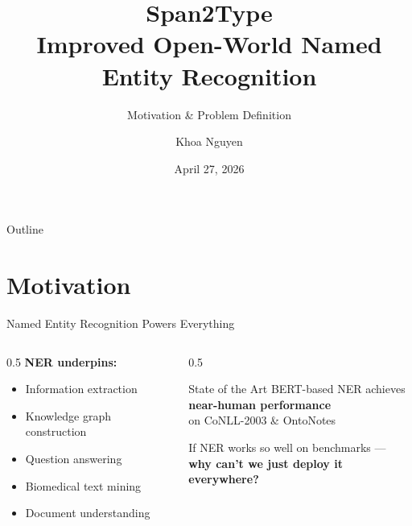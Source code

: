 \documentclass[aspectratio=169]{beamer}
\title[Span2Type]{\textbf{Span2Type}\\
  \large Improved Open-World Named Entity Recognition}
\subtitle{Motivation \& Problem Definition}
\author{Khoa Nguyen}
\date{April 27, 2026}
\newcommand{\highlight}[1]{\textcolor{accent}{\textbf{#1}}}
\begin{document}
\begin{frame}
  \titlepage
\end{frame}

\begin{frame}{Outline}
  \tableofcontents
\end{frame}

\section{Motivation}

\begin{frame}{Named Entity Recognition Powers Everything}
  \begin{columns}[T]
    \begin{column}{0.5\textwidth}
      \textbf{NER underpins:}
      \begin{itemize}\setlength\itemsep{6pt}
        \item Information extraction
        \item Knowledge graph construction
        \item Question answering
        \item Biomedical text mining
        \item Document understanding
      \end{itemize}
    \end{column}
    \begin{column}{0.5\textwidth}
      \begin{block}{State of the Art}
        BERT-based NER achieves\\[4pt]
        \centering\highlight{near-human performance}\\[4pt]
        on CoNLL-2003 \& OntoNotes
      \end{block}
      \vspace{10pt}
      \begin{keybox}
        If NER works so well on benchmarks ---\\
        \textbf{why can't we just deploy it everywhere?}
      \end{keybox}
    \end{column}
  \end{columns}
\end{frame}
\end{document}
